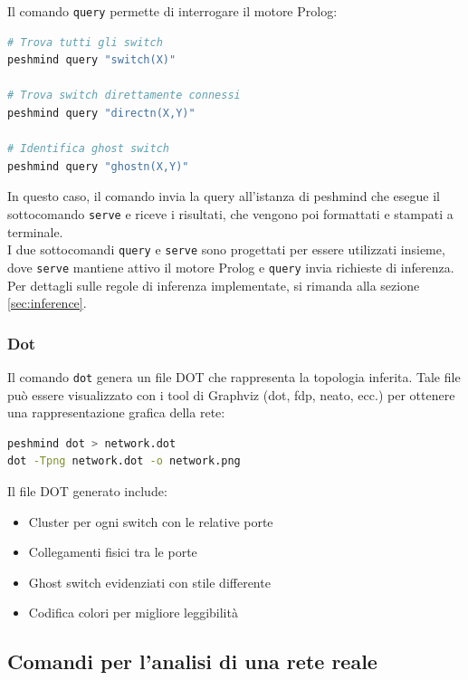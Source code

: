 \documentclass[12pt,a4paper]{article}
\begin{document}
Il comando \texttt{query} permette di interrogare il motore Prolog:

\begin{lstlisting}[language=bash]
# Trova tutti gli switch
peshmind query "switch(X)"

# Trova switch direttamente connessi
peshmind query "directn(X,Y)"

# Identifica ghost switch
peshmind query "ghostn(X,Y)"
\end{lstlisting}

In questo caso, il comando invia la query all'istanza di peshmind che esegue il sottocomando \texttt{serve} e riceve
i risultati, che vengono poi formattati e stampati a terminale. \\
I due sottocomandi \texttt{query} e \texttt{serve} sono progettati per essere utilizzati insieme, 
dove \texttt{serve} mantiene attivo il motore Prolog e \texttt{query} invia richieste di inferenza. \\
Per dettagli sulle regole di inferenza implementate, si rimanda alla sezione \ref{sec:inference}.

\subsubsection{Dot}

Il comando \texttt{dot} genera un file DOT che rappresenta la topologia inferita. Tale file può essere visualizzato 
con i tool di Graphviz (dot, fdp, neato, ecc.) per ottenere una rappresentazione grafica della rete: \\

\begin{lstlisting}[language=bash]
peshmind dot > network.dot
dot -Tpng network.dot -o network.png
\end{lstlisting}

Il file DOT generato include:
\begin{itemize}
    \item Cluster per ogni switch con le relative porte
    \item Collegamenti fisici tra le porte
    \item Ghost switch evidenziati con stile differente
    \item Codifica colori per migliore leggibilità
\end{itemize}

\subsection{Comandi per l'analisi di una rete reale}
\end{document}
